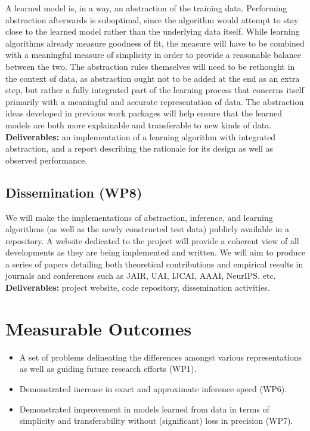 \documentclass[11pt,english,twocolumn]{article}
\begin{document}
A learned model is, in a way, an abstraction of the training data. Performing
abstraction afterwards is suboptimal, since the algorithm would attempt to
stay close to the learned model rather than the underlying data itself. While
learning algorithms already measure goodness of fit, the measure will have to be
combined with a meaningful measure of simplicity in order to provide a
reasonable balance between the two. The abstraction rules themselves will need
to be rethought in the context of data, as abstraction ought not to be added at
the end as an extra step, but rather a fully integrated part of the learning
process that concerns itself primarily with a meaningful and accurate
representation of data. The abstraction ideas developed in previous work
packages will help ensure that the learned models are both more explainable and
transferable to new kinds of data. \textbf{Deliverables:} an implementation of a
learning algorithm with integrated abstraction, and a report describing the
rationale for its design as well as observed performance.

\subsection*{Dissemination (WP8)}

We will make the implementations of abstraction, inference, and learning
algorithms (as well as the newly constructed test data) publicly available in a
repository. A website dedicated to the project will provide a coherent view of
all developments as they are being implemented and written. We will aim to
produce a series of papers detailing both theoretical contributions and
empirical results in journals and conferences such as JAIR, UAI, IJCAI, AAAI,
NeurIPS, etc. \textbf{Deliverables:} project website, code repository,
dissemination activities.

\section{Measurable Outcomes}

\begin{itemize}
\item A set of problems delineating the differences amongst various
  representations as well as guiding future research efforts (WP1).
\item Demonstrated increase in exact and approximate inference speed (WP6).
\item Demonstrated improvement in models learned from data in terms of
  simplicity and transferability without (significant) loss in precision (WP7).
\end{itemize}
\end{document}
